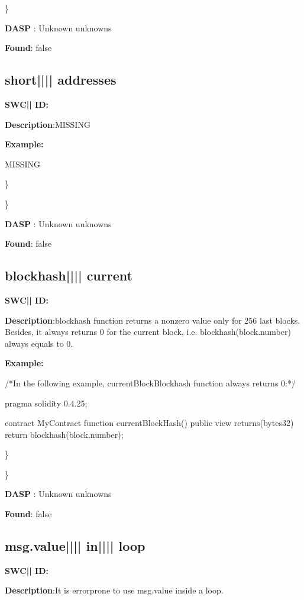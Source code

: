 \documentclass{article}
\begin{document}
\} 

\textbf{DASP} : Unknown unknowns

\textbf{Found}: false

\subsection{short{||\textunderscore|| }addresses} 
\textbf{SWC{|\textunderscore| }ID:} 

\textbf{Description}:MISSING


\textbf{Example:} 
\begin{ffcode} 

MISSING

\end{ffcode} 
\} 

\} 

\textbf{DASP} : Unknown unknowns

\textbf{Found}: false

\subsection{blockhash{||\textunderscore|| }current} 
\textbf{SWC{|\textunderscore| }ID:} 

\textbf{Description}:blockhash function returns a non{\textendash}zero value only for 256 last blocks. Besides, it always returns 0 for the current block, i.e. blockhash(block.number) always equals to 0.


\textbf{Example:} 
\begin{ffcode} 

/*In the following example, currentBlockBlockhash function always returns 0:*/ 

pragma solidity 0.4.25;

contract MyContract {
    function currentBlockHash() public view returns(bytes32) {
        return blockhash(block.number);
    }
}

\end{ffcode} 
\} 

\} 

\textbf{DASP} : Unknown unknowns

\textbf{Found}: false

\subsection{msg.value{||\textunderscore|| }in{||\textunderscore|| }loop} 
\textbf{SWC{|\textunderscore| }ID:} 

\textbf{Description}:It is error{\textendash}prone to use msg.value inside a loop.
\end{document}
